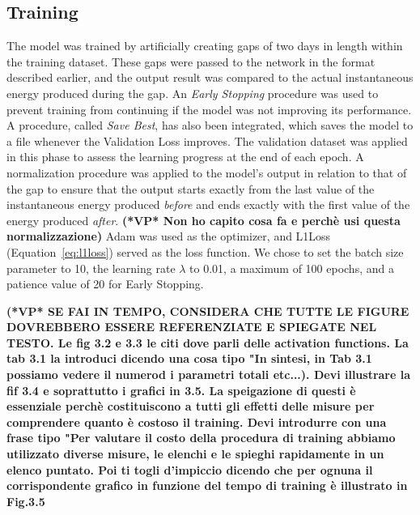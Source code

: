 \subsection{Training}
The model was trained by artificially creating gaps of two days in length within the
training dataset.
These gaps were passed to the network in the format described earlier,
and the output result was compared to the actual instantaneous energy produced during the gap.
An \textit{Early Stopping}\cite{es} procedure was used
to prevent training from continuing if
the model was not improving its performance.
A procedure, called \textit{Save Best}, has also been integrated,
which saves the model to a file whenever the Validation Loss improves.
The validation dataset was applied in this phase to assess the learning progress at the end
of each epoch.
A normalization procedure was applied to the model's output in relation to
that of the gap to ensure that the output starts exactly from the last value of the
instantaneous energy produced \textit{before} and ends exactly with the first value
of the energy produced \textit{after}.
{\bf (*VP* Non ho capito cosa fa e perchè usi questa normalizzazione)}
Adam\cite{adam} was used as the optimizer,
and L1Loss\cite{loss} (Equation~\ref{eq:l1loss}) served as the loss function. %
We chose to set the batch size parameter to 10, the learning rate $\lambda$ to 0.01,
a maximum of 100 epochs, and a patience value of 20 for Early Stopping.

	{\bf (*VP* SE FAI IN TEMPO, CONSIDERA CHE TUTTE LE FIGURE DOVREBBERO ESSERE REFERENZIATE E SPIEGATE NEL TESTO. Le fig 3.2 e 3.3 le citi dove parli delle activation functions. La tab 3.1 la introduci dicendo una cosa tipo "In sintesi, in Tab 3.1 possiamo vedere il numerod i parametri totali etc...). Devi illustrare la fif 3.4 e soprattutto i grafici in 3.5. La speigazione di questi è essenziale perchè costituiscono a tutti gli effetti delle misure per comprendere quanto è costoso il training. Devi introdurre con una frase tipo "Per valutare il costo della procedura di training abbiamo utilizzato diverse misure, le elenchi e le spieghi rapidamente in un elenco puntato. Poi ti togli d'impiccio dicendo che per ognuna il corrispondente grafico in funzione del tempo di training è illustrato in Fig.3.5}

